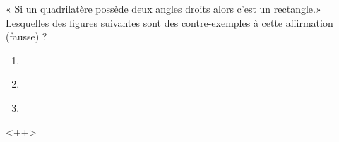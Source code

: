 
\begin{exercice}\label{exosmath-0789}

    « Si un quadrilatère possède deux angles droits alors c'est un rectangle.» Lesquelles des figures suivantes sont des contre-exemples à cette affirmation (fausse) ?

    \begin{multicols}{2}
    \begin{enumerate}
        \item
            \begin{center}
               
            \end{center}

        \item
        \begin{center}
            
        \end{center}
    \item

\begin{center}
   
\end{center}


    \end{enumerate}
    \end{multicols}
    
    <++>

\end{exercice}
